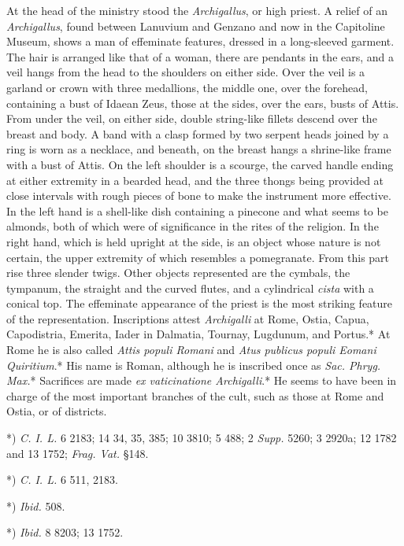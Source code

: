 \documentclass[a4paper, 11pt, oneside, polutonikogreek, english]{article}
\begin{document}
At the head of the ministry stood the \emph{Archigallus}, or high priest. A relief of an \emph{Archigallus}, found between Lanuvium and Genzano and now in the Capitoline Museum, shows a man of effeminate features, dressed in a long-sleeved garment. The hair is arranged like that of a woman, there are pendants in the ears, and a veil hangs from the head to the shoulders on either side. Over the veil is a garland or
crown with three medallions, the middle one, over the forehead, containing a bust of Idaean Zeus, those at the sides, over the ears, busts of Attis. From under the veil, on either side, double string-like fillets descend over the breast and body. A band with a clasp formed by two serpent heads joined by a ring is worn as a necklace, and beneath, on the breast hangs a shrine-like frame with a bust of Attis. On the left shoulder is a scourge, the carved handle ending at either extremity in a bearded head, and the three thongs being provided at close intervals with rough pieces of bone to make the instrument more effective. In the left hand is a shell-like dish containing a pinecone and what seems to be almonds, both of which were of significance in the rites of the religion. In the right hand, which is held upright at the side, is an object whose nature is not certain, the upper extremity of which resembles a pomegranate. From this part rise three slender twigs. Other objects represented are the cymbals, the tympanum, the straight and the curved flutes, and a cylindrical \emph{cista} with a conical top. The effeminate appearance of the priest is the most striking feature of the representation. Inscriptions attest \emph{Archigalli} at Rome, Ostia, Capua, Capodistria, Emerita, Iader in Dalmatia, Tournay, Lugdunum, and Portus.* At Rome he is also called \emph{Attis populi Romani} and \emph{Atus publicus populi Eomani Quiritium}.* His name is Roman, although he is inscribed once as \emph{Sac. Phryg. Max.}* Sacrifices are made \emph{ex vaticinatione Archigalli}.* He seems to have been in charge of the most important branches of the cult, such as those at Rome and Ostia, or of districts.

*) \emph{C. I. L.} 6 2183; 14 34, 35, 385; 10 3810; 5 488; 2 \emph{Supp.} 5260; 3 2920a; 12 1782 and 13 1752; \emph{Frag. Vat.} §148.

*) \emph{C. I. L.} 6 511, 2183.

*) \emph{Ibid.} 508.

*) \emph{Ibid.} 8 8203; 13 1752.
\end{document}
